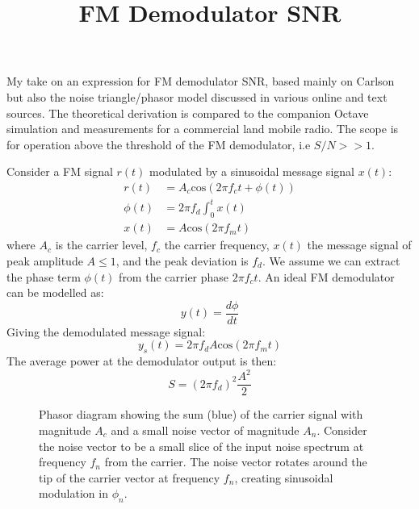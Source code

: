 \documentclass{article}
\begin{document}
\title{FM Demodulator SNR}
\maketitle

My take on an expression for FM demodulator SNR, based mainly on Carlson \cite{crilly2009communication} but also the noise triangle/phasor model discussed in various online and text sources.  The theoretical derivation is compared to the companion Octave simulation and measurements for a commercial land mobile radio. The scope is for operation above the threshold of the FM demodulator, i.e $S/N>>1$.

Consider a FM signal $r(t)$ modulated by a sinusoidal message signal $x(t)$:
\begin{equation}
\begin{split}
r(t) &= A_c \mathrm{cos}(2 \pi f_c t +\phi(t)) \\
\phi(t) &=  2 \pi f_d \int_0^t x(t) \\
x(t) &= A \mathrm{cos}(2 \pi f_m t)
\end{split}
\end{equation}
where $A_c$ is the carrier level, $f_c$ the carrier frequency, $x(t)$ the message signal of peak amplitude $A \le 1$, and the peak deviation is $f_d$.  We assume we can extract the phase term $\phi(t)$ from the carrier phase $2 \pi f_c t$. An ideal FM demodulator can be modelled as: 
\begin{equation}
\label{eq:fm_demod}
y(t) = \frac{d\phi}{dt}
\end{equation}
Giving the demodulated message signal:
\begin{equation}
\label{eq:fm_signal}
y_s(t) = 2 \pi f_d A \mathrm{cos} (2 \pi f_m t)
\end{equation}
The average power at the demodulator output is then:
\begin{equation}
\label{eq:fm_signal_power}
S = (2 \pi f_d )^2 \frac{A^2}{2}
\end{equation}

\begin{figure}[h]
\begin{center}
\end{center}
\caption{Phasor diagram showing the sum (blue) of the carrier signal with magnitude $A_c$ and a small noise vector of magnitude $A_n$.  Consider the noise vector to be a small slice of the input noise spectrum at frequency $f_n$ from the carrier. The noise vector rotates around the tip of the carrier vector at frequency $f_n$, creating sinusoidal modulation in $\phi_n$.}
\label{fig:phasor}
\end{figure}
\end{document}
